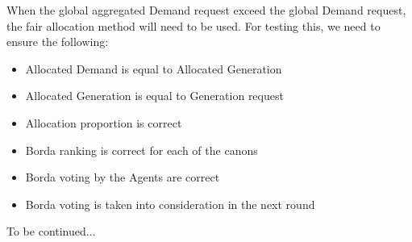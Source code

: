 When the global aggregated Demand request exceed the global Demand request, the fair allocation method will need to be used. For testing this, we need to ensure the following:

\begin{itemize}
	\item Allocated Demand is equal to Allocated Generation
	\item Allocated Generation is equal to Generation request
	\item Allocation proportion is correct
	\item Borda ranking is correct for each of the canons
	\item Borda voting by the Agents are correct
	\item Borda voting is taken into consideration in the next round
\end{itemize}

To be continued...

